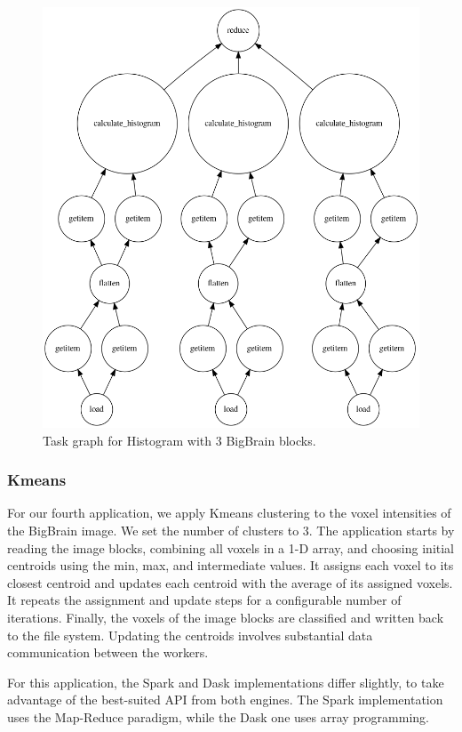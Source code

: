 \documentclass[conference]{IEEEtran}
\begin{document}
\begin{figure}[!hb]
	\centering
	\includegraphics[height=\columnwidth,
	angle=0]{figures/histogram.png}
	\caption{Task graph for Histogram with 3 BigBrain blocks.}
	\label{fig:graph-histogram}
\end{figure}
	
\subsubsection{Kmeans}
For our fourth application, we apply Kmeans clustering to the voxel
intensities of the BigBrain image. We set the number of clusters to 3. The
application starts by reading the image blocks, combining all voxels in a
1-D array, and choosing initial centroids using the min, max, and
intermediate values. It assigns each voxel to its closest centroid and
updates each centroid with the average of its assigned voxels. It repeats
the assignment and update steps for a configurable number of iterations.
Finally, the voxels of the image blocks are classified and written back to
the file system. Updating the centroids involves substantial data
communication between the workers.

For this application, the Spark and Dask implementations differ slightly,
to take advantage of the best-suited API from both engines. The Spark
implementation uses the Map-Reduce paradigm, while the Dask one uses array
programming.
	
\end{document}
